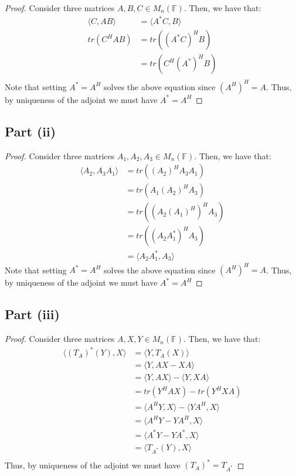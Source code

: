 \documentclass{article}
\begin{document}
\begin{proof}
Consider three matrices $A, B, C \in M_n(\mathbb{F})$. Then, we have that:
\begin{align*}
\langle C, AB \rangle &= \langle A^{*}C, B \rangle \\
tr(C^{H}AB) &= tr((A^{*}C)^{H}B) \\
&= tr(C^{H}(A^{*})^{H}B) \\
\end{align*}
Note that setting $A^{*} = A^{H}$ solves the above equation since $(A^{H})^{H} = A$. Thus, by uniqueness of the adjoint we must have $A^{*} = A^{H}$
\end{proof}

\subsection*{Part (ii)}

\begin{proof}
Consider three matrices $A_1, A_2, A_3 \in M_n(\mathbb{F})$. Then, we have that:
\begin{align*}
\langle A_2, A_{3}A_{1} \rangle &= tr((A_{2})^{H}A_{3}A_{1}) \\
&= tr(A_{1}(A_{2})^{H}A_{3}) \\
&= tr((A_{2}(A_{1})^{H})^{H}A_{3}) \\
&= tr((A_{2}A_{1}^{*})^{H}A_{3}) \\
&= \langle A_{2}A_1^{*}, A_{3} \rangle
\end{align*}
Note that setting $A^{*} = A^{H}$ solves the above equation since $(A^{H})^{H} = A$. Thus, by uniqueness of the adjoint we must have $A^{*} = A^{H}$
\end{proof}

\subsection*{Part (iii)}

\begin{proof}
Consider three matrices $A, X, Y \in M_n(\mathbb{F})$. Then, we have that:
\begin{align*}
\langle (T_{A})^{*}(Y), X \rangle &= \langle Y, T_{A}(X) \rangle \\
&= \langle Y, AX - XA \rangle \\
&= \langle Y, AX \rangle - \langle Y, XA \rangle \\
&= tr(Y^{H}AX) - tr(Y^{H}XA) \\
&= \langle A^{H}Y, X \rangle - \langle YA^{H}, X \rangle \\
&= \langle A^{H}Y - YA^{H}, X \rangle \\
&= \langle A^{*}Y - YA^{*}, X \rangle \\
&= \langle T_{A^{*}}(Y), X \rangle \\
\end{align*}
Thus, by uniqueness of the adjoint we must have $(T_{A})^{*} = T_{A^{*}}$
\end{proof}
\end{document}
